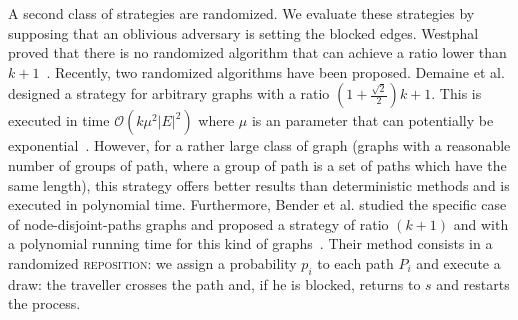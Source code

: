 \documentclass[letter-size, 11pt]{article}
\newcommand{\card}[1]{\left| #1 \right|}
\newcommand{\stpaths}{$(s,t)$-paths}
\newcommand{\mcalp}{\mathcal{P}}
\begin{document}
A second class of strategies are randomized. We evaluate these strategies by supposing that an oblivious adversary is setting the blocked edges. Westphal proved that there is no randomized algorithm that can achieve a ratio lower than $k+1$~\cite{We08}. Recently, two randomized algorithms have been proposed. Demaine et al. designed a strategy for arbitrary graphs with a ratio $\left(1+\frac{\sqrt{2}}{2}\right)k+1$. This is executed in time $\mathcal{O}\left(k\mu^2\card{E}^2\right)$ where $\mu$ is an parameter that can potentially be exponential~\cite{DeHuLiSa14}. However, for a rather large class of graph (graphs with a reasonable number of groups of path, where a group of path is a set of paths which have the same length), this strategy offers better results than deterministic methods and is executed in polynomial time. Furthermore, Bender et al. studied the specific case of node-disjoint-paths graphs and proposed a strategy of ratio $\left(k+1\right)$ and with a polynomial running time for this kind of graphs~\cite{BeWe15}. Their method consists in a randomized \textsc{reposition}: we assign a probability $p_i$ to each path $P_i$ and execute a draw: the traveller crosses the path and, if he is blocked, returns to $s$ and restarts the process.

\end{document}
